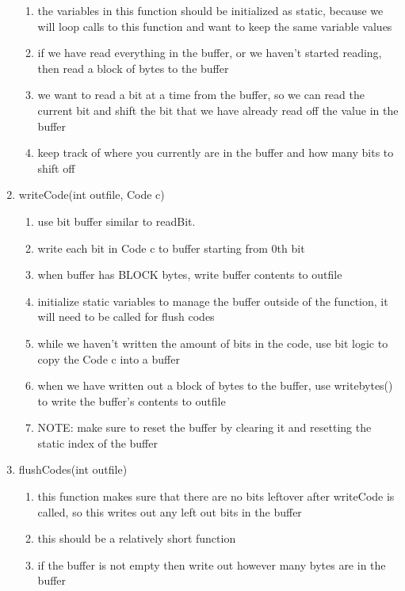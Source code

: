 \documentclass[11pt]{article}
\begin{document}
\begin{enumerate}
\begin{enumerate}
	\item the variables in this function should be initialized as static, because we will loop calls to this function and want to keep the same variable values
	\item if we have read everything in the buffer, or we haven't started reading, then read a block of bytes to the buffer
	\item we want to read a bit at a time from the buffer, so we can read the current bit and shift the bit that we have already read off the value in the buffer
	\item keep track of where you currently are in the buffer and how many bits to shift off
	\end{enumerate}
\item writeCode(int outfile, Code c)
	\begin{enumerate}
	\item use bit buffer similar to readBit.
	\item write each bit in Code c to buffer starting from 0th bit
	\item when buffer has BLOCK bytes, write buffer contents to outfile
	\item initialize static variables to manage the buffer outside of the function, it will need to be called for flush codes
	\item while we haven't written the amount of bits in the code, use bit logic to copy the Code c into a buffer
	\item when we have written out a block of bytes to the buffer, use writebytes() to write the buffer's contents to outfile
	\item NOTE: make sure to reset the buffer by clearing it and resetting the static index of the buffer
	\end{enumerate}
\item flushCodes(int outfile)
	\begin{enumerate}
	\item this function makes sure that there are no bits leftover after writeCode is called, so this writes out any left out bits in the buffer
	\item this should be a relatively short function
	\item if the buffer is not empty then write out however many bytes are in the buffer
	\end{enumerate}
\end{enumerate}
\end{document}
